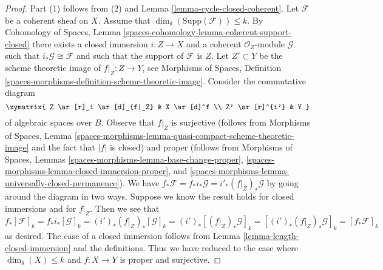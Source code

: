 \begin{proof}
Part (1) follows from (2) and Lemma \ref{lemma-cycle-closed-coherent}.
Let $\mathcal{F}$ be a coherent sheaf on $X$.
Assume that $\dim_\delta(\text{Supp}(\mathcal{F})) \leq k$.
By Cohomology of Spaces, Lemma
\ref{spaces-cohomology-lemma-coherent-support-closed}
there exists a closed immersion $i : Z \to X$ and a coherent
$\mathcal{O}_Z$-module $\mathcal{G}$ such that
$i_*\mathcal{G} \cong \mathcal{F}$ and such that the support
of $\mathcal{F}$ is $Z$. Let $Z' \subset Y$ be the scheme theoretic image
of $f|_Z : Z \to Y$, see Morphisms of Spaces, Definition
\ref{spaces-morphisms-definition-scheme-theoretic-image}.
Consider the commutative diagram
$$
\xymatrix{
Z \ar[r]_i \ar[d]_{f|_Z} &
X \ar[d]^f \\
Z' \ar[r]^{i'} & Y
}
$$
of algebraic spaces over $B$. Observe that $f|_Z$ is surjective
(follows from Morphisms of Spaces, Lemma
\ref{spaces-morphisms-lemma-quasi-compact-scheme-theoretic-image}
and the fact that $|f|$ is closed) and proper
(follows from Morphisms of Spaces, Lemmas
\ref{spaces-morphisms-lemma-base-change-proper},
\ref{spaces-morphisms-lemma-closed-immersion-proper}, and
\ref{spaces-morphisms-lemma-universally-closed-permanence}).
We have $f_*\mathcal{F} = f_*i_*\mathcal{G} = i'_*(f|_Z)_*\mathcal{G}$
by going around the diagram in two ways. Suppose we know the result holds
for closed immersions and for $f|_Z$. Then we see that
$$
f_*[\mathcal{F}]_k = f_*i_*[\mathcal{G}]_k
= (i')_*(f|_Z)_*[\mathcal{G}]_k =
(i')_*[(f|_Z)_*\mathcal{G}]_k =
[(i')_*(f|_Z)_*\mathcal{G}]_k = [f_*\mathcal{F}]_k
$$
as desired. The case of a closed immersion follows from
Lemma \ref{lemma-length-closed-immersion} and the definitions.
Thus we have reduced to the case where
$\dim_\delta(X) \leq k$ and $f : X \to Y$ is proper and surjective.


\end{proof}

